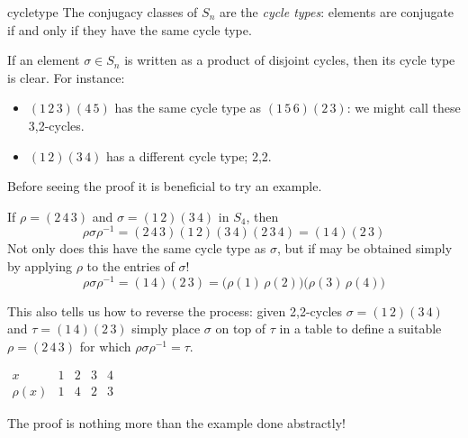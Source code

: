 \begin{thm}{}{cycletype}
	The conjugacy classes of $S_n$ are the \emph{cycle types}: elements are conjugate if and only if they have the same cycle type.
\end{thm}

If an element $\sigma\in S_n$ is written as a product of disjoint cycles, then its cycle type is clear. For instance:
\begin{itemize}
  \item $(1\,2\,3)(4\,5)$ has the same cycle type as $(1\,5\,6)(2\,3)$: we might call these 3,2-cycles.
  \item $(1\,2)(3\,4)$ has a different cycle type; 2,2.
\end{itemize}

\goodbreak

Before seeing the proof it is beneficial to try an example.

\begin{example}{}{}
If $\rho=(2\,4\,3)$ and $\sigma=(1\,2)(3\,4)$ in $S_4$, then
  \[
  	\rho\sigma\rho^{-1}=(2\,4\,3)(1\,2)(3\,4)(2\,3\,4)=(1\,4)(2\,3)
  \]
  Not only does this have the same cycle type as $\sigma$, but if may be obtained simply by applying $\rho$ to the entries of $\sigma$!
  \[
  	\rho\sigma\rho^{-1}=(1\,4)(2\,3) 
  	=\bigl(\rho(1)\,\rho(2)\bigr)\bigl(\rho(3)\,\rho(4)\bigr)
  \]
  \begin{minipage}[t]{0.75\linewidth}\vspace{-5pt}
	  This also tells us how to reverse the process: given 2,2-cycles $\sigma=(1\,2)(3\,4)$ and $\tau=(1\,4)(2\,3)$ simply place $\sigma$ on top of $\tau$ in a table to define a suitable $\rho=(2\,4\,3)$ for which $\rho\sigma\rho^{-1}=\tau$.
	  \end{minipage}
	  \hfill
	  \begin{minipage}[t]{0.2\linewidth}\vspace{-5pt}
	    $\begin{array}{l|cccc}
	  		x&1&2&3&4\\\hline
	  		\rho(x)&1&4&2&3
	  	\end{array}$
  \end{minipage}
\end{example}

The proof is nothing more than the example done abstractly!

